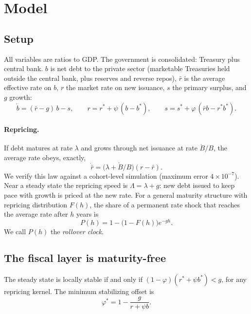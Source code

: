 \section{Model}\label{sec:model}

\subsection{Setup}\label{sec:setup}

All variables are ratios to GDP. The government is consolidated: Treasury plus central bank. $b$ is net debt to the private sector (marketable Treasuries held outside the central bank, plus reserves and reverse repos), $\bar r$ is the average effective rate on $b$, $r$ the market rate on new issuance, $s$ the primary surplus, and $g$ growth:
\begin{equation}
\dot b=(\bar r-g)\,b-s,\qquad r=r^*+\psi\,(b-b^*),\qquad s=s^*+\varphi\,(\bar r b-r^*b^*).
\end{equation}

\paragraph{Repricing.} If debt matures at rate $\lambda$ and grows through net issuance at rate $\dot B/B$, the average rate obeys, exactly,
\begin{equation}
\dot{\bar r}=\big(\lambda+\dot B/B\big)(r-\bar r).
\end{equation}
We verify this law against a cohort-level simulation (maximum error $4\times10^{-7}$). Near a steady state the repricing speed is $\Lambda=\lambda+g$: new debt issued to keep pace with growth is priced at the new rate. For a general maturity structure with repricing distribution $F(h)$, the share of a permanent rate shock that reaches the average rate after $h$ years is
\begin{equation}
P(h)=1-\big(1-F(h)\big)e^{-gh}.
\end{equation}
We call $P(h)$ the \emph{rollover clock}.

\subsection{The fiscal layer is maturity-free}\label{sec:fiscallayer}

\begin{proposition}\label{prop:threshold}
The steady state is locally stable if and only if $(1-\varphi)(r^*+\psi b^*)<g$, for any repricing kernel. The minimum stabilizing offset is
\begin{equation}
\varphi^*=1-\frac{g}{r+\psi b}.
\end{equation}
\end{proposition}

